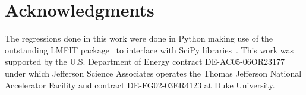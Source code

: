 \documentclass[10pt,aps,prc,twocolumn]{revtex4-1}
\begin{document}
\section{Acknowledgments}

The regressions done in this work were done in Python making use of the
outstanding LMFIT package~\cite{Newville:2014} to interface with SciPy
libraries~\cite{Jones:2001}.
This work was supported by the U.S.  Department of Energy contract DE-AC05-06OR23177
under which Jefferson Science Associates operates the Thomas Jefferson National 
Accelerator Facility and contract DE-FG02-03ER4123 at Duke University.


\end{document}
